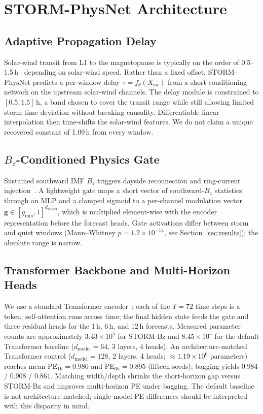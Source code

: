 \documentclass[conference]{IEEEtran}
\begin{document}
\section{STORM-PhysNet Architecture}

\subsection{Adaptive Propagation Delay}
Solar-wind transit from L1 to the magnetopause is typically on the order of 0.5--1.5\,h~\cite{b3,b4} depending on solar-wind speed. Rather than a fixed offset,
STORM-PhysNet predicts a per-window delay \(\tau = f_\theta(X_{\mathrm{sw}})\) from a short conditioning network on the upstream solar-wind channels. The delay module is constrained to \([0.5, 1.5]\,\mathrm{h}\), a band chosen to cover the transit range while still allowing limited storm-time deviation without breaking causality. Differentiable linear interpolation then time-shifts the solar-wind features. We do not claim a unique recovered constant of 1.09\,h from every window.

\subsection{\(B_z\)-Conditioned Physics Gate}
Sustained southward IMF \(B_z\) triggers dayside reconnection and ring-current
injection~\cite{b2}. A lightweight gate maps a short vector of
southward-\(B_z\) statistics through an MLP and a clamped sigmoid to a
per-channel modulation vector \(\mathbf{g}\in[g_{\min},1]^{d_{\mathrm{model}}}\), which is multiplied element-wise with the encoder representation
before the forecast heads. Gate activations differ between storm and quiet windows
(Mann--Whitney \(p = 1.2\times10^{-14}\), see Section~\ref{sec:results}); the absolute range
is narrow.

\subsection{Transformer Backbone and Multi-Horizon Heads}
We use a standard Transformer encoder~\cite{b16}: each of the \(T=72\)
time steps is a token; self-attention runs across time; the final hidden state
feeds the gate and three residual heads for the 1\,h, 6\,h, and 12\,h
forecasts. Measured parameter counts are approximately $3.43\times10^{5}$ for
STORM-Bz and $8.45\times10^{5}$ for the default Transformer baseline
($d_{\mathrm{model}}=64$, 3 layers, 4 heads). An architecture-matched Transformer
control ($d_{\mathrm{model}}=128$, 2 layers, 4 heads; $\approx1.19\times10^{6}$
parameters) reaches mean PE$_{1\mathrm{h}}=0.980$ and PE$_{6\mathrm{h}}=0.895$
(fifteen seeds); bagging yields $0.984$ / $0.908$ / $0.861$. Matching width/depth
shrinks the short-horizon gap versus STORM-Bz and improves multi-horizon PE under
bagging. The default baseline is not architecture-matched; single-model PE differences
should be interpreted with this disparity in mind.
\end{document}
